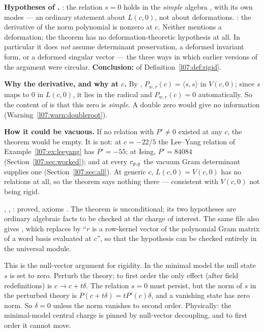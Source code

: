 \begin{dictionary}
\textbf{Hypotheses of .} : the relation $s = 0$ holds in the
\emph{simple} algebra , with its own modes  --- an ordinary
statement about $L(c,0)$, not about deformations. : the derivative  of the
norm polynomial is nonzero at $c$. Neither mentions a deformation; the theorem has no deformation-theoretic
hypothesis at all. In particular it does \emph{not} assume determinant preservation, a deformed invariant
form, or a deformed singular vector --- the three ways in which earlier versions of the argument were
circular. \textbf{Conclusion:}  of Definition~\ref{l07:def:rigid}.

\textbf{Why the derivative, and why at $c$.} By , $P_{w,r}(c) = \langle s,s\rangle$ in
$V(c,0)$; since $s$ maps to $0$ in $L(c,0)$, it lies in the radical and $P_{w,r}(c) = 0$ automatically. So the
content of  is that this zero is \emph{simple}. A double zero would give no information
(Warning~\ref{l07:warn:doubleroot}).

\textbf{How it could be vacuous.} If no relation with $P'\neq0$ existed at any $c$, the theorem would be empty.
It is not: at $c = -22/5$ the Lee--Yang relation of Example~\ref{l07:ex:leeyang} has $P' = -55$; at Ising,
$P' = 84084$ (Section~\ref{l07:sec:worked}); and at every $c_{p,q}$ the vacuum Gram determinant supplies one
(Section~\ref{l07:sec:all}). At generic $c$, $L(c,0) = V(c,0)$ has no relations at all, so the theorem says
nothing there --- consistent with $V(c,0)$ not being rigid.
\end{dictionary}

\begin{status}
, , :
proved, axioms . The theorem is unconditional; its two
hypotheses are ordinary algebraic facts to be checked at the charge of interest. The same file also gives
, which replaces  by ``$r$ is a row-kernel vector of the
polynomial Gram matrix of a word basis evaluated at $c$'', so that the hypothesis can be checked entirely in
the universal module.
\end{status}

\begin{physics}
This is the null-vector argument for rigidity. In the minimal model the null state $s$ is set to zero. Perturb
the theory; to first order the only effect (after field redefinitions) is $c\to c+t\delta$. The relation $s=0$ must
persist, but the norm of $s$ in the perturbed theory is $P(c+t\delta)=tP'(c)\delta$, and a vanishing state has
zero norm. So $\delta=0$ unless the norm vanishes to second order. Physically: the minimal-model central
charge is pinned by null-vector decoupling, and to first order it cannot move.
\end{physics}

